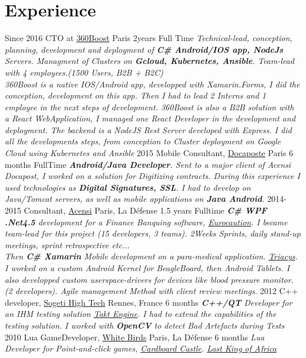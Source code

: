 \documentclass{emonides-cv}
\begin{document}
\section{Experience}
\begin{entrylist}
  \entry
    {Since  2016}
    {CTO at \href{https://360boost.com/}{360Boost}  {\normalfont Paris}}
    {2years Full Time}
    {\emph{Technical-lead, conception, planning, development and deployment of \textbf{C\# Android/IOS app, NodeJs} Servers.
     Managment of Clusters on \textbf{Gcloud, Kubernetes, Ansible}. Team-lead with 4 employees.(1500 Users, B2B + B2C)
    \\360Boost is a native IOS/Android app, developped with Xamarin.Forms, I did the conception, development on this app.
    Then I had to lead 2 Interns and 1 employee in the next steps of development.
    360Boost is also a B2B solution with a React WebApplication, I managed one React Developer
    in the development and deployment.
    The backend is a NodeJS Rest Server developed with Express. I did all the developments steps, from conception 
    to Cluster deployment on Google Cloud using Kubernetes and Ansible}}
  \entry
    {2015}
    {Mobile Consultant, \href{https://www.docapost.com/en/}{Docaposte} {\normalfont Paris}}
    {6 months FullTime}
    {\emph{\textbf{Android/Java Developer}. Sent to a major client of Acensi Docapost, I worked on a solution for Digitizing contracts.
    During this experience I used technologies as \textbf{Digital Signatures, SSL}.
    I had to develop on Java/Tomcat servers, as well as mobile applications on \textbf{Java Android}.}}
  \entry
    {2014-2015}
    {Consultant, \href{https://www.acensi.fr/}{Acensi} {\normalfont Paris, La Défense}}
    {1.5 years Fulltime}
    {\emph{\textbf{C\# WPF .Net4.5} development for a Finance Banquing software, \href{https://www.eurocaution.net/}{Eurocaution}.
    I became team-lead for this project (15 developers, 3 teams). 2Weeks Sprints, daily stand-up meetings, sprint retrospective etc...
    \\Then \textbf{C\# Xamarin} Mobile development on a para-medical application. \href{http://www.triacys.com/}{Triacys}.
    I worked on a custom Android Kernel for BeagleBoard, then Android Tablets. I also developped custom userspace-drivers for devices like blood pressure monitor.
    (2 developers). Agile management Method with client review meetings. }}
  \entry
    {2012}
    {C++ developer, \href{https://www.acensi.fr/}{Sogeti High Tech} {\normalfont Rennes, France}}
    {6 months}
    {\emph{\textbf{C++/QT} Developer for an IHM testing solution \href{https://www.eurocaution.net/}{Takt Engine}.
    I had to extend the capabilities of the testing solution. I worked with \textbf{OpenCV} to detect Bad Artefacts during Tests }}
  \entry
    {2010}
    {Lua GameDeveloper, \href{https://www.giantbomb.com/white-birds-productions/3010-5637/}{White Birds} {\normalfont Paris, La Défense}}
    {6 months}
    {\emph{Lua Developer for Point-and-click games, \href{https://www.bigfishgames.com/games/6859/cardboard-castle/}{Cardboard Castle}. \href{https://www.wikiwand.com/fr/White_Birds_Productions}{Last King of Africa}}}
\end{entrylist}
\end{document}
